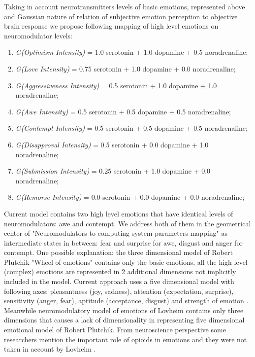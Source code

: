 Taking in account neurotransmitters levels of basic emotions, represented above  and Gaussian nature of relation of subjective emotion perception to objective brain response \cite{senticcomputing, neuralcorrelatesofhate, emotionsbraintorobot} we propose following mapping of high level emotions on neuromodulator levels:

\begin{enumerate}
 \item  \emph{G(Optimism Intensity)} = 1.0 serotonin  + 1.0 dopamine + 0.5 noradrenaline;
 \item  \emph{G(Love Intensity)} = 0.75 serotonin + 1.0 dopamine + 0.0 noradrenaline;
 \item  \emph{G(Aggressiveness Intensity)} = 0.5 serotonin + 1.0 dopamine + 1.0 noradrenaline;
 \item  \emph{G(Awe Intensity)} = 0.5 serotonin + 0.5 dopamine + 0.5 noradrenaline;
 \item  \emph{G(Contempt Intensity)} = 0.5 serotonin + 0.5 dopamine + 0.5 noradrenaline;
 \item  \emph{G(Disapproval Intensity)} = 0.5 serotonin + 0.0 dopamine + 1.0 noradrenaline;
 \item  \emph{G(Submission Intensity)} = 0.25 serotonin + 1.0 dopamine + 0.0 noradrenaline;
 \item  \emph{G(Remorse Intensity)} = 0.0 serotonin + 0.0 dopamine + 0.0 noradrenaline;
\end{enumerate}

Current model contains two high level emotions that have identical levels of neuromodulators: awe and contempt. We address both of them in the geometrical center of "Neuromodulators to computing system parameters mapping" as intermediate states in between: fear and surprise for awe, disgust and anger for contempt. One possible explanation: the three dimensional model of Robert Plutchik "Wheel of emotions" contains only the basic emotions, all the high level (complex) emotions are represented in 2 additional dimensions not implicitly included in the model. Current approach uses a five dimensional model with following axes: pleasantness (joy, sadness), attention (expectation, surprise), sensitivity (anger, fear), aptitude (acceptance, disgust) and strength of emotion \cite{senticcomputing, hourglass}. Meanwhile neuromodulatory model of emotions of Lovheim contains only three dimensions that causes a lack of dimensionality in representing five dimensional emotional model of Robert Plutchik. From neuroscience perspective some researchers mention the important role of opioids in emotions and they were not taken in account by Lovheim \cite{emotionsbraintorobot, neuromodulatory}.

